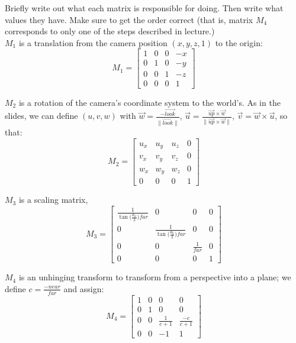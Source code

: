 \documentclass[10pt,twocolumn]{article}
\begin{document}
\begin{framed}
\noindent {\bf [1/2 pt. each]} Briefly write out what each matrix is responsible for doing. Then write what values they have. Make sure to get the order correct (that is, matrix $M_4$ corresponds to only one of the steps described in lecture.)\\

$M_1$ is a translation from the camera position $(x, y, z, 1)$ to the origin:
\[M_1 = \begin{bmatrix}
    1 & 0 & 0 & -x \\
    0 & 1 & 0 & -y \\
    0 & 0 & 1 & -z \\
    0 & 0 & 0 & 1
\end{bmatrix}\]

$M_2$ is a rotation of the camera's coordinate system to the world's. As in the slides, we can define $(u, v, w)$ with $\vec{w} = \frac{-\vec{look}}{\lVert\vec{look}\rVert}$, $\vec{u} = \frac{\vec{up} \times \vec{w}}{\lVert\vec{up} \times \vec{w}\rVert}$, $\vec{v} = \vec{w} \times \vec{u}$, so that:
\[M_2 = \begin{bmatrix}
    u_x & u_y & u_z & 0 \\
    v_x & v_y & v_z & 0 \\
    w_x & w_y & w_z & 0 \\
    0 & 0 & 0 & 1
\end{bmatrix}\]

$M_3$ is a scaling matrix,
\[M_3 = \begin{bmatrix}
    \frac{1}{\tan\big(\frac{\theta_w}{2}\big) far} & 0 & 0 & 0 \\
    0 & \frac{1}{\tan\big(\frac{\theta_h}{2}\big) far} & 0 & 0 \\
    0 & 0 & \frac{1}{far} & 0 \\
    0 & 0 & 0 & 1
\end{bmatrix}\]

$M_4$ is an unhinging transform to transform from a perspective into a plane; we define $c = \frac{-near}{far}$ and assign:
\[M_4 = \begin{bmatrix}
    1 & 0 & 0 & 0 \\
    0 & 1 & 0 & 0 \\
    0 & 0 & \frac{1}{c+1} & \frac{-c}{c+1} \\
    0 & 0 & -1 & 1
\end{bmatrix}\]
\vspace{3em}

\end{framed}
\end{document}
